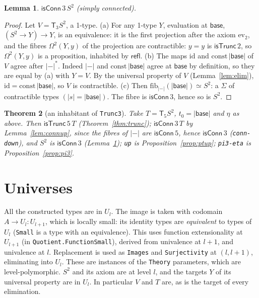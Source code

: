 \documentclass[11pt]{amsart}
\newtheorem{theorem}{Theorem}
\newtheorem{lemma}[theorem]{Lemma}
\theoremstyle{definition}
\theoremstyle{remark}
\newcommand{\Om}{\Omega}
\newcommand{\fib}{\mathrm{fib}}
\newcommand{\Tr}[1]{\mathsf{T}_{#1}}
\newcommand{\un}[1]{|#1|}
\newcommand{\code}[1]{\texttt{#1}}
\newcommand{\cT}{\mathsf{isTrunc}}
\newcommand{\cC}{\mathsf{isConn}}
\begin{document}
\begin{lemma}\label{lem:s2conn}
$\cC\,3\,S^2$ (simply connected).
\end{lemma}
\begin{proof}
Let $V=\Tr3S^2$, a 1-type. (a) For any 1-type $Y$, evaluation at
$\mathsf{base}$, $(S^2\to Y)\to Y$, is an equivalence: it is the first
projection after the axiom $\mathrm{ev}_2$, and the fibres
$\Om^2(Y,y)$ of the projection are contractible: $y=y$ is
$\cT\,2$, so $\Om^2(Y,y)$ is a proposition, inhabited by $\mathsf{refl}$. (b) The maps $\mathrm{id}$ and
$\mathrm{const}\,\un{\mathsf{base}}$ of $V$ agree after $\un-^*$. Indeed
$\un-$ and $\mathrm{const}\,\un{\mathsf{base}}$ agree at $\mathsf{base}$
by definition, so they are equal by (a) with $Y=V$. By the universal
property of $V$ (Lemma~\ref{lem:elim}), $\mathrm{id}=\mathrm{const}\,\un{\mathsf{base}}$,
so $V$ is contractible. (c) Then $\fib_{\un-}(\un{\mathsf{base}})\simeq S^2$:
a $\Sigma$ of contractible types $(\un s=\un{\mathsf{base}})$. The fibre
is $\cC\,3$, hence so is $S^2$.
\end{proof}

\begin{theorem}[an inhabitant of \code{Trunc3}]
Take $T=\Tr5S^2$, $t_0=\un{\mathsf{base}}$ and $\eta$ as above. Then
$\cT\,5\,T$ (Theorem~\ref{thm:trunc}); $\cC\,3\,T$ by
Lemma~\ref{lem:connup}, since the fibres of $\un-$ are $\cC\,5$, hence
$\cC\,3$ (\code{conn-down}), and $S^2$ is $\cC\,3$ (Lemma~\ref{lem:s2conn}); \code{up} is
Proposition~\ref{prop:ptup}; \code{pi3-eta} is Proposition~\ref{prop:pi3}.
\end{theorem}

\section{Universes}

All the constructed types are in $U_l$. The image is taken with
codomain $A\to U_l:U_{l+1}$, which is locally small: its identity types
are \emph{equivalent} to types of $U_l$ (\code{Small} is a type with an
equivalence). This uses function extensionality at $U_{l+1}$ (in
\code{Quotient.FunctionSmall}), derived from univalence at $l+1$, and
univalence at $l$. Replacement is used as \code{Images} and
\code{Surjectivity} at $(l,l+1)$, eliminating into $U_l$. These are
instances of the \code{Theory} parameters, which are level-polymorphic. $S^2$ and its
axiom are at level $l$, and the targets $Y$ of its universal property are
in $U_l$. In particular $V$ and $T$ are, as is the target of every
elimination.
\end{document}
